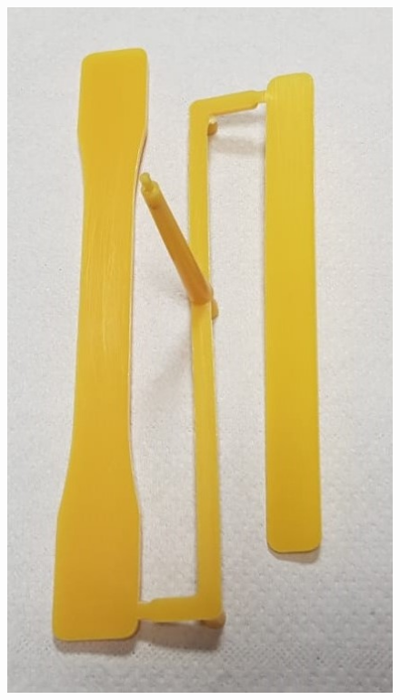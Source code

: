 \documentclass[a4paper, 11pt]{article}
\begin{document}
\begin{figure}[htp]
{\includegraphics[scale=0.25]{HDPE}} \qquad
\subfloat[][]

\end{figure}
\end{document}
